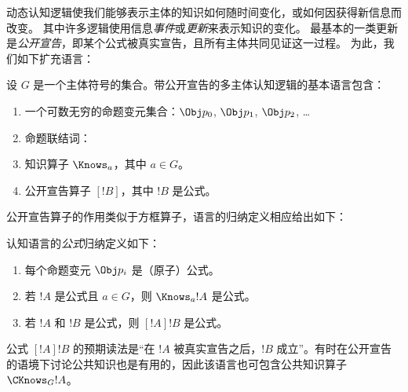 \documentclass[../../../include/open-logic-section]{subfiles}
\begin{document}


动态认知逻辑使我们能够表示主体的知识如何随时间变化，或如何因获得新信息而改变。
其中许多逻辑使用信息\emph{事件}或\emph{更新}来表示知识的变化。
最基本的一类更新是\emph{公开宣告}，即某个公式被真实宣告，且所有主体共同见证这一过程。
为此，我们如下扩充语言：

\begin{defn}
设 $G$ 是一个主体符号的集合。带公开宣告的多主体认知逻辑的基本语言包含：
\begin{enumerate}
  \item 一个可数无穷的命题变元集合：$\Obj p_0$, $\Obj p_1$, $\Obj p_2$, \dots
  \item 命题联结词：\startycommalist
  \item 知识算子 $\Knows_a$，其中 $a \in G$。
  \item 公开宣告算子 $[!B]$，其中 $!B$ 是公式。
\end{enumerate}
\end{defn}

公开宣告算子的作用类似于方框算子，语言的归纳定义相应给出如下：

\begin{defn}
  认知语言的\emph{公式}归纳定义如下：
  \begin{enumerate}


  \item 每个命题变元 $\Obj p_i$ 是（原子）公式。






  \item 若 $!A$ 是公式且 $a \in G$，则 $\Knows_a !A$ 是公式。

  \item 若 $!A$ 和 $!B$ 是公式，则 $[!A] !B$ 是公式。

\end{enumerate}
\end{defn}

公式 $[!A] !B$ 的预期读法是“在 $!A$ 被真实宣告之后，$!B$ 成立”。有时在公开宣告的语境下讨论公共知识也是有用的，因此该语言也可包含公共知识算子~$\CKnows_G !A$。
\end{document}
